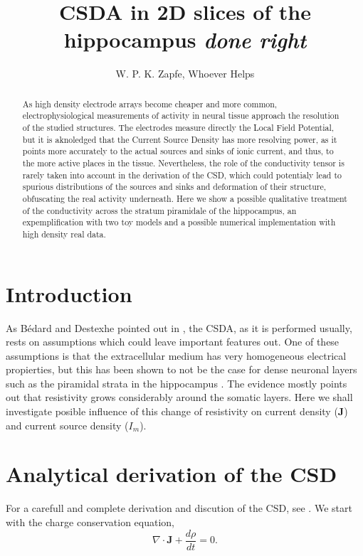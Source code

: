 \documentclass{article}
\title{CSDA in 2D slices of the hippocampus \emph{done right}}
\author{W. P. K. Zapfe, Whoever Helps}
\newcommand{\Jd}{\mathbf{J}}
\begin{document}
\maketitle

\begin{abstract}
As high density electrode arrays become cheaper and more common, 
electrophysiological measurements of activity in neural tissue approach
the resolution of the studied structures. The electrodes measure
directly the Local Field Potential, but it is aknoledged that the
Current Source Density has more resolving power, as it points
more accurately to the actual sources and sinks of ionic current,
and thus, to the more active places in the tissue. Nevertheless,
the role of the conductivity tensor is rarely taken into account
in the derivation of the CSD, which could potentialy lead to
spurious distributions of the sources and sinks and deformation
of their structure, obfuscating the real activity underneath.
Here we show a possible qualitative treatment of the conductivity
across the stratum piramidale of the hippocampus, an expemplification
with two toy models and a possible numerical implementation with
high density real data.
\end{abstract}


\section{Introduction}

As Bédard and Destexhe pointed out in \cite{Bedard11}, the CSDA, as it
is performed usually, rests on
assumptions which could leave important features out. One of these 
assumptions is that the extracellular medium has very homogeneous 
electrical propierties, but this has been shown to not be
the case for dense neuronal layers such as the piramidal
strata in the hippocampus \cite{Holsheimer87, Lopez01, MarioPersonal}.
The evidence mostly points out that resistivity grows 
considerably around the somatic layers. Here we shall investigate
posible influence of this change of resistivity on current density
($\Jd$) and current source density ($I_m$). 



\section{Analytical  derivation of the CSD}

For a carefull and complete derivation and discution of the CSD, 
see \cite{Bedard11}. We start with the charge conservation equation,
\begin{equation}
\nabla \cdot \Jd + \frac{d \rho}{d t} =0.
\end{equation}
\end{document}
